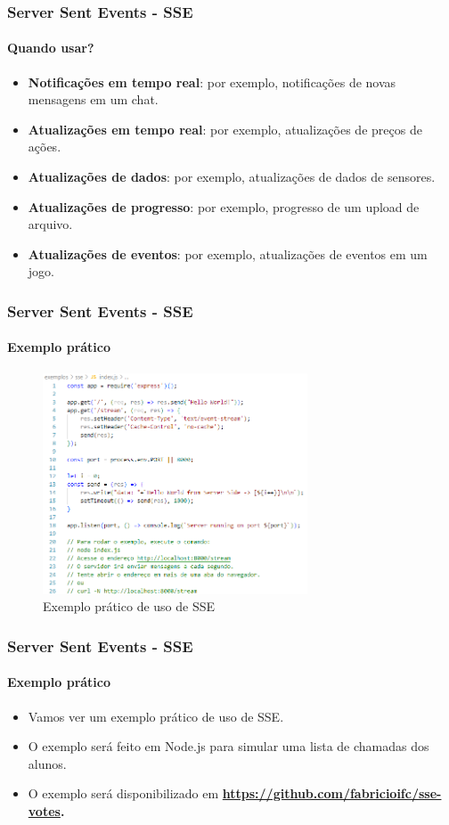 \documentclass[
	9pt, %
	t, %
]{beamer}
\begin{document}
\begin{frame}
	\frametitle{Server Sent Events - SSE}
	\framesubtitle{Quando usar?}

	\begin{itemize}
		\item \textbf{Notificações em tempo real}: por exemplo, notificações de novas mensagens em um chat.
		\item \textbf{Atualizações em tempo real}: por exemplo, atualizações de preços de ações.
		\item \textbf{Atualizações de dados}: por exemplo, atualizações de dados de sensores.
		\item \textbf{Atualizações de progresso}: por exemplo, progresso de um upload de arquivo.
		\item \textbf{Atualizações de eventos}: por exemplo, atualizações de eventos em um jogo.
	\end{itemize}

\end{frame}

\begin{frame}
	\frametitle{Server Sent Events - SSE}
	\framesubtitle{Exemplo prático}

	\begin{figure}
		\centering
		\includegraphics[width=0.7\textwidth]{sse_example.png}
		\caption{Exemplo prático de uso de SSE}
	\end{figure}

\end{frame}

\begin{frame}
	\frametitle{Server Sent Events - SSE}
	\framesubtitle{Exemplo prático}

	\begin{itemize}
		\item Vamos ver um exemplo prático de uso de SSE.
		\item O exemplo será feito em Node.js para simular uma lista de chamadas dos alunos.
		\item O exemplo será disponibilizado em
		      \textbf{\href{https://github.com/fabricioifc/sse-votes}{https://github.com/fabricioifc/sse-votes}.}
	\end{itemize}

\end{frame}
\end{document}
